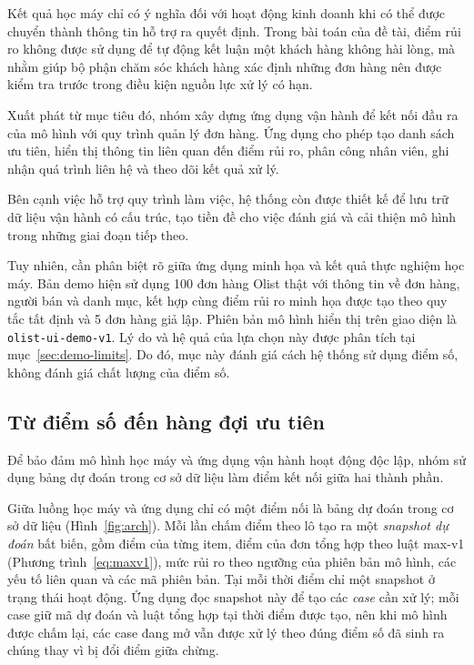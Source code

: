 \documentclass[12pt,a4paper]{report}
\begin{document}
Kết quả học máy chỉ có ý nghĩa đối với hoạt động kinh doanh khi có thể được chuyển thành thông tin hỗ trợ ra quyết định. Trong bài toán của đề tài, điểm rủi ro không được sử dụng để tự động kết luận một khách hàng không hài lòng, mà nhằm giúp bộ phận chăm sóc khách hàng xác định những đơn hàng nên được kiểm tra trước trong điều kiện nguồn lực xử lý có hạn.

Xuất phát từ mục tiêu đó, nhóm xây dựng ứng dụng vận hành để kết nối đầu ra của mô hình với quy trình quản lý đơn hàng. Ứng dụng cho phép tạo danh sách ưu tiên, hiển thị thông tin liên quan đến điểm rủi ro, phân công nhân viên, ghi nhận quá trình liên hệ và theo dõi kết quả xử lý.

Bên cạnh việc hỗ trợ quy trình làm việc, hệ thống còn được thiết kế để lưu trữ dữ liệu vận hành có cấu trúc, tạo tiền đề cho việc đánh giá và cải thiện mô hình trong những giai đoạn tiếp theo.

Tuy nhiên, cần phân biệt rõ giữa ứng dụng minh họa và kết quả thực nghiệm học máy. Bản demo hiện sử dụng 100 đơn hàng Olist thật với thông tin về đơn hàng, người bán và danh mục, kết hợp cùng điểm rủi ro minh họa được tạo theo quy tắc tất định và 5 đơn hàng giả lập. Phiên bản mô hình hiển thị trên giao diện là \texttt{olist-ui-demo-v1}. Lý do và hệ quả của lựa chọn này được phân tích tại mục~\ref{sec:demo-limits}. Do đó, mục này đánh giá cách hệ thống sử dụng điểm số, không đánh giá chất lượng của điểm số.

\subsection{Từ điểm số đến hàng đợi ưu tiên}

Để bảo đảm mô hình học máy và ứng dụng vận hành hoạt động độc lập, nhóm sử dụng bảng dự đoán trong cơ sở dữ liệu làm điểm kết nối giữa hai thành phần.

Giữa luồng học máy và ứng dụng chỉ có một điểm nối là bảng dự đoán trong cơ sở dữ liệu (Hình~\ref{fig:arch}). Mỗi lần chấm điểm theo lô tạo ra một \emph{snapshot dự đoán} bất biến, gồm điểm của từng item, điểm của đơn tổng hợp theo luật max-v1 (Phương trình~\ref{eq:maxv1}), mức rủi ro theo ngưỡng của phiên bản mô hình, các yếu tố liên quan và các mã phiên bản. Tại mỗi thời điểm chỉ một snapshot ở trạng thái hoạt động. Ứng dụng đọc snapshot này để tạo các \emph{case} cần xử lý; mỗi case giữ mã dự đoán và luật tổng hợp tại thời điểm được tạo, nên khi mô hình được chấm lại, các case đang mở vẫn được xử lý theo đúng điểm số đã sinh ra chúng thay vì bị đổi điểm giữa chừng.
\end{document}
